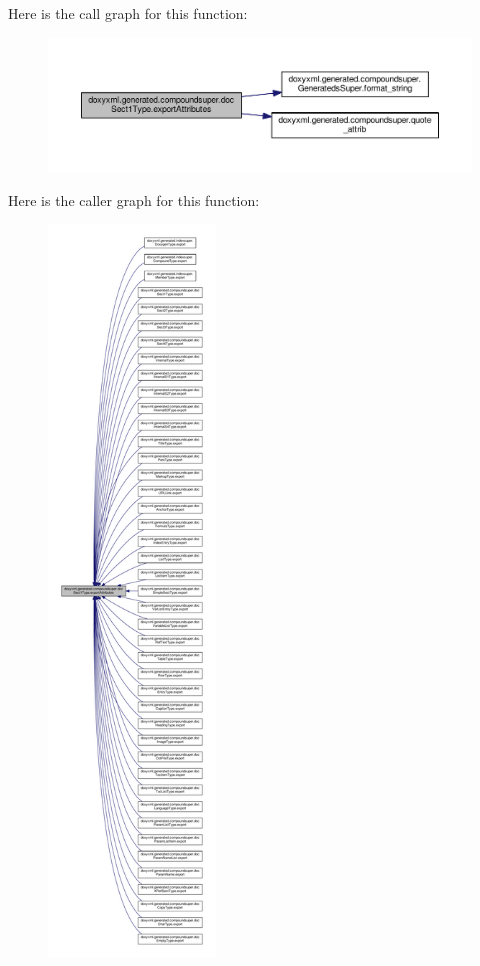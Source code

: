 Here is the call graph for this function\+:
\nopagebreak
\begin{figure}[H]
\begin{center}
\leavevmode
\includegraphics[width=350pt]{d8/ddc/classdoxyxml_1_1generated_1_1compoundsuper_1_1docSect1Type_ab3da4dc0adb205ec9d59bcc6d60bb24d_cgraph}
\end{center}
\end{figure}




Here is the caller graph for this function\+:
\nopagebreak
\begin{figure}[H]
\begin{center}
\leavevmode
\includegraphics[height=550pt]{d8/ddc/classdoxyxml_1_1generated_1_1compoundsuper_1_1docSect1Type_ab3da4dc0adb205ec9d59bcc6d60bb24d_icgraph}
\end{center}
\end{figure}


